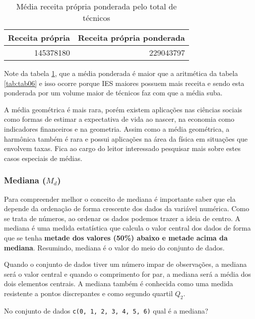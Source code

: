 \documentclass[11pt,]{style/krantz}
\renewenvironment{quote}{\begin{VF}}{\end{VF}}
\theoremstyle{definition}
\theoremstyle{definition}
\theoremstyle{definition}
\theoremstyle{remark}
\let\BeginKnitrBlock\begin \let\EndKnitrBlock\end
\begin{document}
\begin{table}[!h]

\caption{\label{tab:tab07}Média receita própria ponderada pelo total de técnicos}
\centering
\begin{tabular}{r|r}
\hline
Receita própria & Receita própria ponderada\\
\hline
145378180 & 229043797\\
\hline
\end{tabular}
\end{table}

Note da tabela \ref{tab:tab07}, que a média ponderada é maior que a aritmética da tabela \ref{tab:tab06} e isso ocorre porque IES maiores possuem mais receita e sendo esta ponderada por um volume maior de técnicos faz com que a média suba.

A média geométrica é mais rara, porém existem aplicações nas ciências sociais como formas de estimar a expectativa de vida ao nascer, na economia como indicadores financeiros e na geometria. Assim como a média geométrica, a harmônica também é rara e possui aplicações na área da física em situações que envolvem taxas. Fica ao cargo do leitor interessado pesquisar mais sobre estes casos especiais de médias.

\hypertarget{mediana-m_d}{%
\subsubsection{\texorpdfstring{Mediana (\(M_d\))}{Mediana (M\_d)}}\label{mediana-m_d}}

Para compreender melhor o conceito de mediana é importante saber que ela depende da ordenação de forma crescente dos dados da variável numérica. Como se trata de números, ao ordenar os dados podemos trazer a ideia de centro. A mediana é uma medida estatística que calcula o valor central dos dados de forma que se tenha \textbf{metade dos valores (50\%) abaixo e metade acima da mediana}. Resumindo, mediana é o valor do meio do conjunto de dados.

\begin{quote}
Quando o conjunto de dados tiver um número impar de observações, a mediana será o valor central e quando o comprimento for par, a mediana será a média dos dois elementos centrais. A mediana também é conhecida como uma medida resistente a pontos discrepantes e como segundo quartil \(Q_2\).
\end{quote}

\BeginKnitrBlock{example}
\protect\hypertarget{exm:unnamed-chunk-50}{}{\label{exm:unnamed-chunk-50} }No conjunto de dados \texttt{c(0,\ 1,\ 2,\ 3,\ 4,\ 5,\ 6)} qual é a mediana?
\EndKnitrBlock{example}
\end{document}
